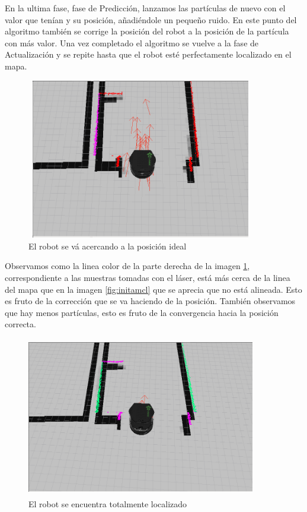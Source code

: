 En la ultima fase, fase de Predicción, lanzamos las partículas de nuevo con el valor que tenían y su posición, añadiéndole un pequeño ruido.
En este punto del algoritmo también se corrige la posición del robot a la posición de la partícula con más valor.
Una vez completado el algoritmo se vuelve a la fase de Actualización y se repite hasta que el robot esté perfectamente localizado en el 
mapa.

\begin{figure}[hbtp]
  \begin{center}
    \includegraphics[width=10cm,height=7cm]{img/cap3/actamcl}
  \end{center}
  \caption{El robot se vá acercando a la posición ideal}
  \label{fig:actamcl}
\end{figure}
\pagebreak

Observamos como la linea color de la parte derecha de la imagen \ref{fig:actamcl}, correspondiente a las muestras tomadas con el láser, está más cerca de la linea del mapa que en la imagen \ref{fig:initamcl} que se aprecia que no está alineada. Esto es fruto de la corrección que se va haciendo de la posición. También observamos que hay menos partículas, esto es fruto de la convergencia hacia la posición correcta.

\begin{figure}[hbtp]
  \begin{center}
    \includegraphics[width=10cm,height=7cm]{img/cap3/finamcl}
  \end{center}
  \caption{El robot se encuentra totalmente localizado}
  \label{fig:finamcl}
\end{figure}

